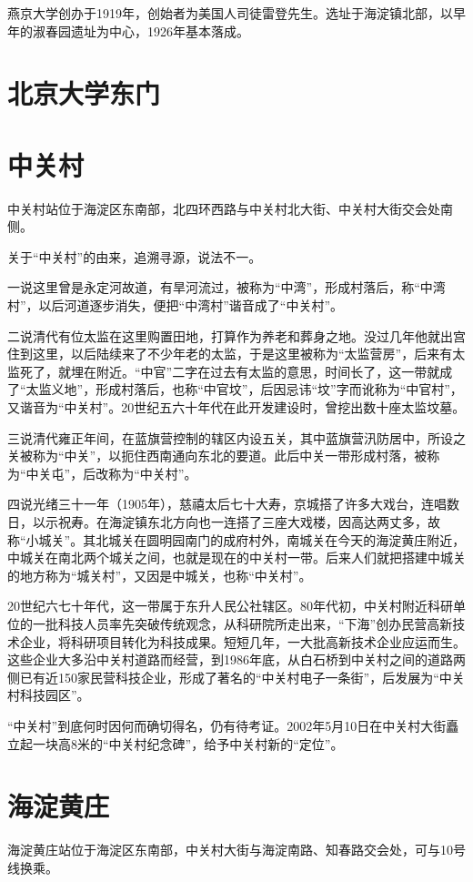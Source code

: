 燕京大学创办于1919年，创始者为美国人司徒雷登先生。选址于海淀镇北部，以早年的淑春园遗址为中心，1926年基本落成。

\section{北京大学东门}

\section{中关村}
中关村站位于海淀区东南部，北四环西路与中关村北大街、中关村大街交会处南侧。

关于“中关村”的由来，追溯寻源，说法不一。

一说这里曾是永定河故道，有旱河流过，被称为“中湾”，形成村落后，称“中湾村”，以后河道逐步消失，便把“中湾村”谐音成了“中关村”。

二说清代有位太监在这里购置田地，打算作为养老和葬身之地。没过几年他就出宫住到这里，以后陆续来了不少年老的太监，于是这里被称为“太监营房”，后来有太监死了，就埋在附近。“中官”二字在过去有太监的意思，时间长了，这一带就成了“太监义地”，形成村落后，也称“中官坟”，后因忌讳“坟”字而讹称为“中官村”，又谐音为“中关村”。20世纪五六十年代在此开发建设时，曾挖出数十座太监坟墓。

三说清代雍正年间，在蓝旗营控制的辖区内设五关，其中蓝旗营汛防居中，所设之关被称为“中关”，以扼住西南通向东北的要道。此后中关一带形成村落，被称为“中关屯”，后改称为“中关村”。

四说光绪三十一年（1905年），慈禧太后七十大寿，京城搭了许多大戏台，连唱数日，以示祝寿。在海淀镇东北方向也一连搭了三座大戏楼，因高达两丈多，故称“小城关”。其北城关在圆明园南门的成府村外，南城关在今天的海淀黄庄附近，中城关在南北两个城关之间，也就是现在的中关村一带。后来人们就把搭建中城关的地方称为“城关村”，又因是中城关，也称“中关村”。

20世纪六七十年代，这一带属于东升人民公社辖区。80年代初，中关村附近科研单位的一批科技人员率先突破传统观念，从科研院所走出来，“下海”创办民营高新技术企业，将科研项目转化为科技成果。短短几年，一大批高新技术企业应运而生。这些企业大多沿中关村道路而经营，到1986年底，从白石桥到中关村之间的道路两侧已有近150家民营科技企业，形成了著名的“中关村电子一条街”，后发展为“中关村科技园区”。

“中关村”到底何时因何而确切得名，仍有待考证。2002年5月10日在中关村大街矗立起一块高8米的“中关村纪念碑”，给予中关村新的“定位”。

\section{海淀黄庄}
海淀黄庄站位于海淀区东南部，中关村大街与海淀南路、知春路交会处，可与10号线换乘。

